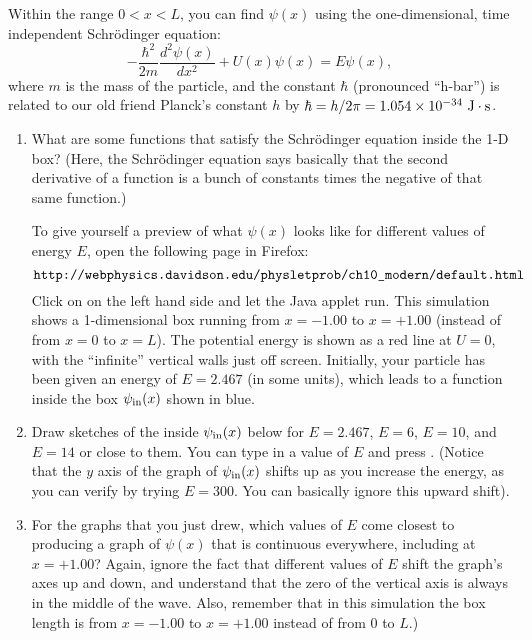 \bigskip 
Within the range $0<x<L$, you can find $\psi(x)$ using the one-dimensional, time independent Schr\"odinger equation:
$$-\frac{\hbar^2}{2m} \frac{d^2\psi(x)}{dx^2} + U(x)\psi(x) = E\psi(x),$$
where $m$ is the mass of the particle, and the constant $\hbar$ (pronounced ``h-bar'') is related to our old friend Planck's constant $h$ by $\hbar = {h}/{2\pi} = 1.054 \times 10^{-34}~{\rm J} \cdot {\rm s}$.
\medskip
\begin{enumerate}

\item What are some functions that satisfy the Schrödinger equation inside the 1-D box? (Here, the
Schr\"odinger equation says basically that the second derivative of a function is a bunch of constants times the negative of that same function.)
\answerspace{0.8in}

To give yourself a preview of what $\psi(x)$ looks like for different values of energy $E$, open the
following page in Firefox:
$$\verb!http://webphysics.davidson.edu/physletprob/ch10_modern/default.html!$$
Click on  on the left hand side and let the Java applet run. This simulation shows a 1-dimensional box running from $x =-1.00$ to $x=+1.00$ (instead of from $x=0$ to $x=L$). The potential energy is shown as a red line at $U=0$, with the ``infinite'' vertical walls just off screen. Initially, your particle has been given an energy of $E=2.467$ (in some units), which leads to a function inside the box $\psi_{\rm in}(x)$ shown in blue. 

\item Draw sketches of the inside $\psi_{\rm in}(x)$ below for $E=2.467$, $E=6$, $E=10$, and $E=14$ or close to them.  You can type in a value of $E$ and press .  (Notice that the $y$ axis of the graph of  $\psi_{\rm in}(x)$ shifts up as you increase the energy, as you can verify by trying $E=300$.  You can basically ignore this upward shift).
\answerspace{1.6in}

\item For the graphs that you just drew, 
which values of $E$ come closest to producing a graph of $\psi(x)$ that is continuous everywhere, including at $x =+1.00$? Again, ignore the fact that different values of $E$ shift the graph's axes up and down, and understand that the zero of the vertical axis is always in the middle of the wave.  Also, remember that in this simulation the box length is from 
$x =-1.00$ to $x=+1.00$ instead of from 0 to $L$.)
\answerspace{0.3in}
\pagebreak[3]


\end{enumerate}
